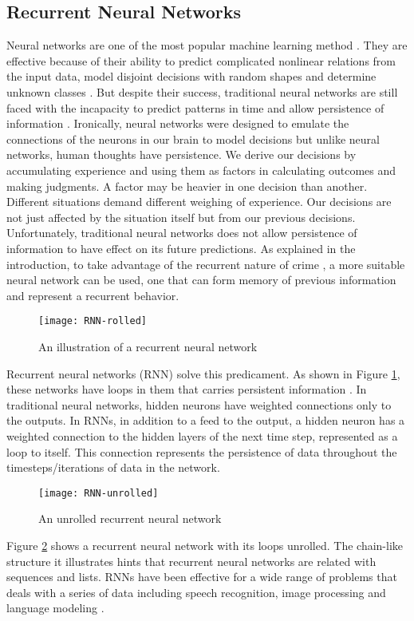 \subsection{Recurrent Neural Networks}
    Neural networks are one of the most popular machine learning method \cite{razi2005comparative}. They are effective because of their ability to predict complicated nonlinear relations from the input data, model disjoint decisions with random shapes and determine unknown classes \cite{huang2006real}. But despite their success, traditional neural networks are still faced with the incapacity to predict patterns in time and allow persistence of information \cite{patan2008artificial}. Ironically, neural networks were designed to emulate the connections of the neurons in our brain to model decisions but unlike neural networks, human thoughts have persistence. We derive our decisions by accumulating experience and using them as factors in calculating outcomes and making judgments. A factor may be heavier in one decision than another. Different situations demand different weighing of experience. Our decisions are not just affected by the situation itself but from our previous decisions. Unfortunately, traditional neural networks does not allow persistence of information to have effect on its future predictions. As explained in the introduction, to take advantage of the recurrent nature of crime \cite{perc2013understanding}, a more suitable neural network can be used, one that can form memory of previous information and represent a recurrent behavior.

    \begin{figure}[H]
    \centering
    \texttt{[image: RNN-rolled]}
    \caption{An illustration of a recurrent neural network \cite{olah2015understanding}}
    \label{fig:rnn-rolled}
    \end{figure}
    Recurrent neural networks (RNN) solve this predicament. As shown in Figure \ref{fig:rnn-rolled}, these networks have loops in them that carries persistent information \cite{mikolov2010recurrent}. In traditional neural networks, hidden neurons have weighted connections only to the outputs. In RNNs, in addition to a feed to the output, a hidden neuron has a weighted connection to the hidden layers of the next time step, represented as a loop to itself. This connection represents the persistence of data throughout the timesteps/iterations of data in the network.

    \begin{figure}[H]
    \centering
    \texttt{[image: RNN-unrolled]}
    \caption{An unrolled recurrent neural network \cite{olah2015understanding}}
    \label{fig:rnn-unrolled}
    \end{figure}
    Figure \ref{fig:rnn-unrolled} shows a recurrent neural network with its loops unrolled. The chain-like structure it illustrates hints that recurrent neural networks are related with sequences and lists. RNNs have been effective for a wide range of problems that deals with a series of data including speech recognition, image processing and language modeling \cite{olah2015understanding}.

